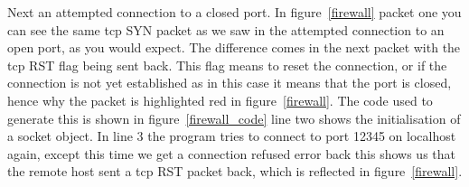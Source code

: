 \documentclass[titlepage]{article}
\begin{document}
Next an attempted connection to a closed port. In figure~\ref{firewall} packet one you can see
the same \gls{tcp} SYN packet as we saw in the attempted connection to an open port, as you
would expect. The difference comes in the next packet with the \gls{tcp} RST flag being sent
back. This flag means to reset the connection, or if the connection is not yet established
as in this case it means that the port is closed, hence why the packet is highlighted red
in figure~\ref{firewall}. The code used to generate this is shown in figure~\ref{firewall_code}
line two shows the initialisation of a socket object. In line 3 the program tries to connect
to port 12345 on localhost again, except this time we get a connection refused error back
this shows us that the remote host sent a \gls{tcp} RST packet back, which is reflected in
figure~\ref{firewall}.
\end{document}
